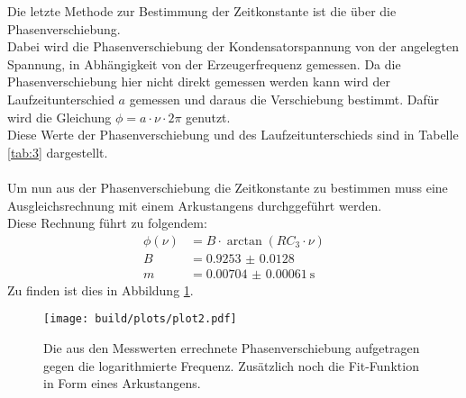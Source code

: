 \noindent Die letzte Methode zur Bestimmung der Zeitkonstante ist die über die Phasenverschiebung.\\ 
Dabei wird die Phasenverschiebung der Kondensatorspannung von der angelegten Spannung, in Abhängigkeit von der Erzeugerfrequenz gemessen.
Da die Phasenverschiebung hier nicht direkt gemessen werden kann wird der Laufzeitunterschied $a$ gemessen und daraus die Verschiebung bestimmt.
Dafür wird die Gleichung $\phi= a\cdot\nu\cdot 2\pi$ genutzt.\\
Diese Werte der Phasenverschiebung und des Laufzeitunterschieds sind in Tabelle \ref{tab:3} dargestellt.\\\\
\noindent Um nun aus der Phasenverschiebung die Zeitkonstante zu bestimmen muss eine Ausgleichsrechnung mit einem Arkustangens durchggeführt werden.\\
Diese Rechnung führt zu folgendem:
\begin{align*}
    \phi(\nu)&=B\cdot \arctan(RC_3 \cdot \nu)\\
    B&=\SI{0.9253(128)}{}\\
    m&=\SI{0.00704(61)}{\second}
\end{align*}
Zu finden ist dies in Abbildung \ref{img:3}.

\begin{figure}[H]
    \centering
    \texttt{[image: build/plots/plot2.pdf]}
    \caption{Die aus den Messwerten errechnete Phasenverschiebung aufgetragen gegen die logarithmierte Frequenz. Zusätzlich noch die Fit-Funktion in Form eines Arkustangens. }
    \label{img:3}
\end{figure}

